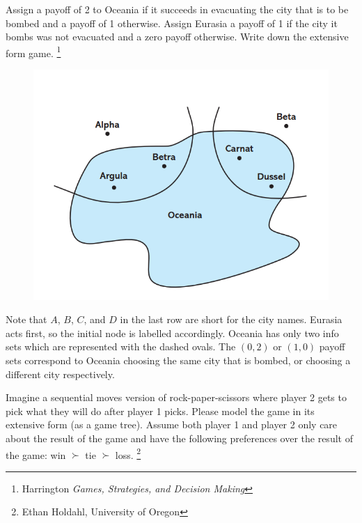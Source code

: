 \documentclass[addpoints, answers]{exam}
\begin{document}
\begin{questions}
Assign a payoff of 2 to Oceania
if it succeeds in evacuating the city that is to be bombed
and a payoff of 1 otherwise.
Assign Eurasia a payoff of 1 if the city it bombs was not evacuated
and a zero payoff otherwise.
Write down the extensive form game.
\footnote{Harrington \textit{Games, Strategies, and Decision Making}}

\begin{figure}[!h]
  \centering
  \includegraphics[width=.3\linewidth]{figures/figPR2.1.png} 
\end{figure}

\begin{solution}
  \begin{center}
     
  \end{center} 

  Note that $A$, $B$, $C$, and $D$ in the last row are short for the city names.
  Eurasia acts first, so the initial node is labelled accordingly.
  Oceania has only two info sets which are represented with the dashed ovals.
  The $(0,2)$ or $(1,0)$ payoff sets correspond to Oceania choosing the same city that is bombed,
  or choosing a different city respectively.
\end{solution}

\newpage



\question%
Imagine a sequential moves version of rock-paper-scissors
where player 2 gets to pick what they will do after player 1 picks.
Please model the game in its extensive form (as a game tree). 
Assume both player 1 and player 2 only care about the result of the game
and have the following preferences over the result of the game:
win $\succ$ tie $\succ$ loss.
\footnote{Ethan Holdahl, University of Oregon }

\end{questions}
\end{document}

